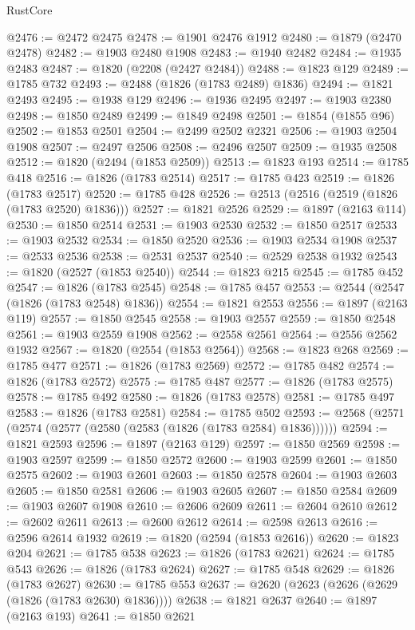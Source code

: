 \begin{lexlean}{RustCore}
\begin{coremodule}
@2476 := @2472 @2475
@2478 := @1901 @2476 @1912
@2480 := @1879 (@2470 @2478)
@2482 := @1903 @2480 @1908
@2483 := @1940 @2482
@2484 := @1935 @2483
@2487 := @1820 (@2208 (@2427 @2484))
@2488 := @1823 @129
@2489 := @1785 @732
@2493 := @2488 (@1826 (@1783 @2489) @1836)
@2494 := @1821 @2493
@2495 := @1938 @129
@2496 := @1936 @2495
@2497 := @1903 @2380
@2498 := @1850 @2489
@2499 := @1849 @2498
@2501 := @1854 (@1855 @96)
@2502 := @1853 @2501
@2504 := @2499 @2502 @2321
@2506 := @1903 @2504 @1908
@2507 := @2497 @2506
@2508 := @2496 @2507
@2509 := @1935 @2508
@2512 := @1820 (@2494 (@1853 @2509))
@2513 := @1823 @193
@2514 := @1785 @418
@2516 := @1826 (@1783 @2514)
@2517 := @1785 @423
@2519 := @1826 (@1783 @2517)
@2520 := @1785 @428
@2526 := @2513 (@2516 (@2519 (@1826 (@1783 @2520) @1836)))
@2527 := @1821 @2526
@2529 := @1897 (@2163 @114)
@2530 := @1850 @2514
@2531 := @1903 @2530
@2532 := @1850 @2517
@2533 := @1903 @2532
@2534 := @1850 @2520
@2536 := @1903 @2534 @1908
@2537 := @2533 @2536
@2538 := @2531 @2537
@2540 := @2529 @2538 @1932
@2543 := @1820 (@2527 (@1853 @2540))
@2544 := @1823 @215
@2545 := @1785 @452
@2547 := @1826 (@1783 @2545)
@2548 := @1785 @457
@2553 := @2544 (@2547 (@1826 (@1783 @2548) @1836))
@2554 := @1821 @2553
@2556 := @1897 (@2163 @119)
@2557 := @1850 @2545
@2558 := @1903 @2557
@2559 := @1850 @2548
@2561 := @1903 @2559 @1908
@2562 := @2558 @2561
@2564 := @2556 @2562 @1932
@2567 := @1820 (@2554 (@1853 @2564))
@2568 := @1823 @268
@2569 := @1785 @477
@2571 := @1826 (@1783 @2569)
@2572 := @1785 @482
@2574 := @1826 (@1783 @2572)
@2575 := @1785 @487
@2577 := @1826 (@1783 @2575)
@2578 := @1785 @492
@2580 := @1826 (@1783 @2578)
@2581 := @1785 @497
@2583 := @1826 (@1783 @2581)
@2584 := @1785 @502
@2593 := @2568 (@2571 (@2574 (@2577 (@2580 (@2583 (@1826 (@1783 @2584) @1836))))))
@2594 := @1821 @2593
@2596 := @1897 (@2163 @129)
@2597 := @1850 @2569
@2598 := @1903 @2597
@2599 := @1850 @2572
@2600 := @1903 @2599
@2601 := @1850 @2575
@2602 := @1903 @2601
@2603 := @1850 @2578
@2604 := @1903 @2603
@2605 := @1850 @2581
@2606 := @1903 @2605
@2607 := @1850 @2584
@2609 := @1903 @2607 @1908
@2610 := @2606 @2609
@2611 := @2604 @2610
@2612 := @2602 @2611
@2613 := @2600 @2612
@2614 := @2598 @2613
@2616 := @2596 @2614 @1932
@2619 := @1820 (@2594 (@1853 @2616))
@2620 := @1823 @204
@2621 := @1785 @538
@2623 := @1826 (@1783 @2621)
@2624 := @1785 @543
@2626 := @1826 (@1783 @2624)
@2627 := @1785 @548
@2629 := @1826 (@1783 @2627)
@2630 := @1785 @553
@2637 := @2620 (@2623 (@2626 (@2629 (@1826 (@1783 @2630) @1836))))
@2638 := @1821 @2637
@2640 := @1897 (@2163 @193)
@2641 := @1850 @2621

\end{coremodule}
\end{lexlean}
